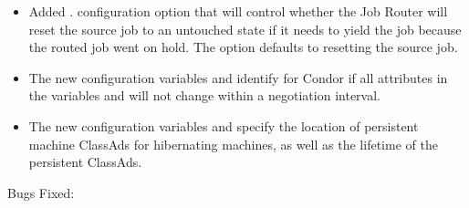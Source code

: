 \begin{itemize}
\item Added . configuration
  option that will control whether the Job Router will reset the
  source job to an untouched state if it needs to yield the job
  because the routed job went on hold.  The option defaults to
  resetting the source job.

\item The new configuration variables 
  and  identify for Condor if all
  attributes in the variables  and
   will not change within
  a negotiation interval.

\item The new configuration variables 
  and  specify the location of
  persistent machine ClassAds for hibernating machines,
  as well as the lifetime of the persistent ClassAds.

\end{itemize}

\noindent Bugs Fixed:

